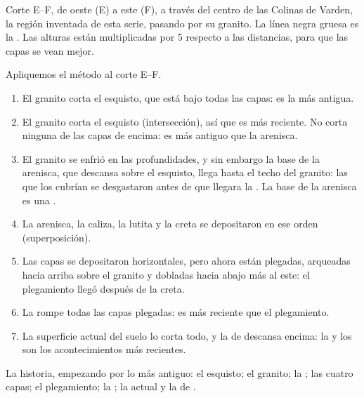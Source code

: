 \begin{omfigure}
\smallskip
{\small Corte E--F, de oeste (E) a este (F), a través del centro de las
Colinas de Varden, la región inventada de esta serie, pasando por su
granito. La línea negra gruesa es la . Las alturas están
multiplicadas por 5 respecto a las distancias, para que las capas se vean
mejor.}
\label{fig:g7:geological-time:section}
\end{omfigure}

\begin{example}\label{ex:g7:geological-time:varden}
Apliquemos el método al corte E--F.
\begin{enumerate}
  \item El granito corta el esquisto, que está bajo todas las capas: es
        la  más antigua.
  \item El granito corta el esquisto (intersección), así que es más
        reciente. No corta ninguna de las capas de encima: es más antiguo
        que la arenisca.
  \item El granito se enfrió en las profundidades, y sin embargo la base
        de la arenisca, que descansa sobre el esquisto, llega hasta el
        techo del granito: las  que los cubrían se desgastaron antes
        de que llegara la . La base de la arenisca es una
        .
  \item La arenisca, la caliza, la lutita y la creta se depositaron en ese
        orden (superposición).
  \item Las capas se depositaron horizontales, pero ahora están plegadas,
        arqueadas hacia arriba sobre el granito y dobladas hacia abajo más
        al este: el plegamiento llegó después de la creta.
  \item La  rompe todas las capas plegadas: es más reciente que el
        plegamiento.
  \item La superficie actual del suelo lo corta todo, y la  de 
        descansa encima: la  y los  son los acontecimientos más
        recientes.
\end{enumerate}
La historia, empezando por lo más antiguo: el esquisto; el granito; la
; las cuatro capas; el plegamiento; la ; la  actual y
la  de .
\end{example}

